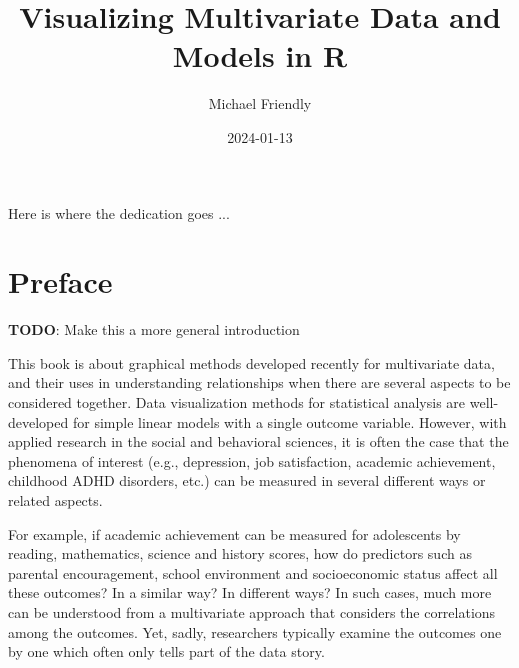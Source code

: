 \documentclass[
  letterpaper,
  10pt,
  krantz2]{krantz}
\title{Visualizing Multivariate Data and Models in R}
\author{Michael Friendly}
\date{2024-01-13}
\renewcommand*\contentsname{Table of contents}
\newcommand\contentsname{Table of contents}
\begin{document}
\maketitle

\thispagestyle{empty}

\begin{center}
Here is where the dedication goes ...
\end{center}

\setlength{\abovedisplayskip}{-5pt}
\setlength{\abovedisplayshortskip}{-5pt}

\ifdefined\Shaded\renewenvironment{Shaded}{\begin{tcolorbox}[colback={codebgcolor}, sharp corners, enhanced, borderline west={3pt}{0pt}{shadecolor}, breakable, frame hidden, boxrule=0pt]}{\end{tcolorbox}}\fi

\renewcommand*\contentsname{Table of contents}
{
\hypersetup{linkcolor=}
\setcounter{tocdepth}{2}
\tableofcontents
}

\hypertarget{preface}{%
\chapter*{Preface}\label{preface}}


\textbf{TODO}: Make this a more general introduction

This book is about graphical methods developed recently for multivariate
data, and their uses in understanding relationships when there are
several aspects to be considered together. Data visualization methods
for statistical analysis are well-developed for simple linear models
with a single outcome variable. However, with applied research in the
social and behavioral sciences, it is often the case that the phenomena
of interest (e.g., depression, job satisfaction, academic achievement,
childhood ADHD disorders, etc.) can be measured in several different
ways or related aspects.

For example, if academic achievement can be measured for adolescents by
reading, mathematics, science and history scores, how do predictors such
as parental encouragement, school environment and socioeconomic status
affect all these outcomes? In a similar way? In different ways? In such
cases, much more can be understood from a multivariate approach that
considers the correlations among the outcomes. Yet, sadly, researchers
typically examine the outcomes one by one which often only tells part of
the data story.
\end{document}
